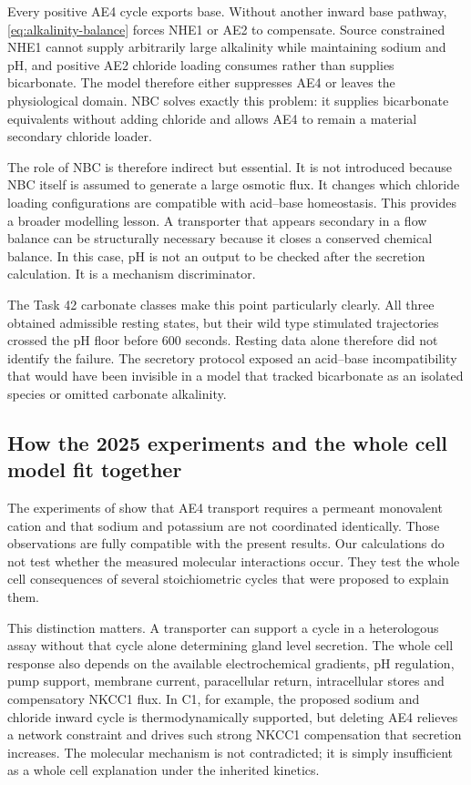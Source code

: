 Every positive AE4 cycle exports base. Without another inward base pathway, \cref{eq:alkalinity-balance} forces NHE1 or AE2 to compensate. Source constrained NHE1 cannot supply arbitrarily large alkalinity while maintaining sodium and pH, and positive AE2 chloride loading consumes rather than supplies bicarbonate. The model therefore either suppresses AE4 or leaves the physiological domain. NBC solves exactly this problem: it supplies bicarbonate equivalents without adding chloride and allows AE4 to remain a material secondary chloride loader.

The role of NBC is therefore indirect but essential. It is not introduced because NBC itself is assumed to generate a large osmotic flux. It changes which chloride loading configurations are compatible with acid--base homeostasis. This provides a broader modelling lesson. A transporter that appears secondary in a flow balance can be structurally necessary because it closes a conserved chemical balance. In this case, pH is not an output to be checked after the secretion calculation. It is a mechanism discriminator.

The Task 42 carbonate classes make this point particularly clearly. All three obtained admissible resting states, but their wild type stimulated trajectories crossed the pH floor before 600 seconds. Resting data alone therefore did not identify the failure. The secretory protocol exposed an acid--base incompatibility that would have been invisible in a model that tracked bicarbonate as an isolated species or omitted carbonate alkalinity.

\subsection{How the 2025 experiments and the whole cell model fit together}

The experiments of \citet{Catalan2025} show that AE4 transport requires a permeant monovalent cation and that sodium and potassium are not coordinated identically. Those observations are fully compatible with the present results. Our calculations do not test whether the measured molecular interactions occur. They test the whole cell consequences of several stoichiometric cycles that were proposed to explain them.

This distinction matters. A transporter can support a cycle in a heterologous assay without that cycle alone determining gland level secretion. The whole cell response also depends on the available electrochemical gradients, pH regulation, pump support, membrane current, paracellular return, intracellular stores and compensatory NKCC1 flux. In C1, for example, the proposed sodium and chloride inward cycle is thermodynamically supported, but deleting AE4 relieves a network constraint and drives such strong NKCC1 compensation that secretion increases. The molecular mechanism is not contradicted; it is simply insufficient as a whole cell explanation under the inherited kinetics.

